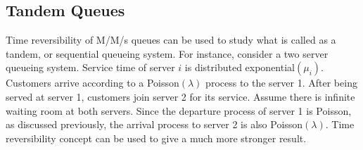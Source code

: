 \documentclass[a4paper,10pt,english]{article}
\begin{document}
\subsection{Tandem Queues}
Time reversibility of M/M/s queues can be used to study what is called as a tandem, or sequential queueing system. For instance, consider a two server queueing system. Service time of server $i$ is distributed exponential$(\mu_i)$. Customers arrive according to a Poisson$(\lambda)$ process to the server 1. After being served at server 1, customers join server  2 for its service. Assume there is infinite waiting room at both servers. Since the departure process of server 1 is Poisson, as discussed previously, the arrival process to server 2 is also Poisson$(\lambda)$. Time reversibility concept can be used to give a much more stronger result.
\end{document}
